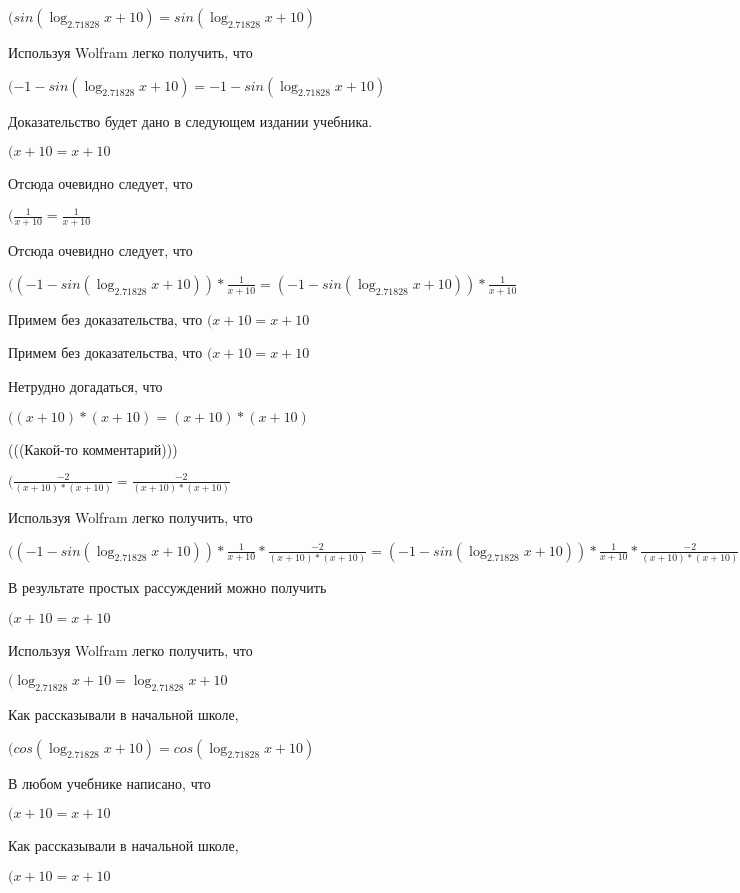 \documentclass[12pt,a4paper,fleqn]{article}
\theoremstyle{definition}
\begin{document}
$(sin(\log_{ 2.71828 }{ x  +  10 }) = sin(\log_{ 2.71828 }{ x  +  10 })$

Используя Wolfram легко получить, что

$( -1  - sin(\log_{ 2.71828 }{ x  +  10 }) =  -1  - sin(\log_{ 2.71828 }{ x  +  10 })$

Доказательство будет дано в следующем издании учебника.

$( x  +  10  =  x  +  10 $

Отсюда очевидно следует, что

$(\frac{ 1 }{ x  +  10 }
 = \frac{ 1 }{ x  +  10 }
$

Отсюда очевидно следует, что

$(( -1  - sin(\log_{ 2.71828 }{ x  +  10 })) * \frac{ 1 }{ x  +  10 }
 = ( -1  - sin(\log_{ 2.71828 }{ x  +  10 })) * \frac{ 1 }{ x  +  10 }
$

Примем без доказательства, что
$( x  +  10  =  x  +  10 $

Примем без доказательства, что
$( x  +  10  =  x  +  10 $

Нетрудно догадаться, что

$(( x  +  10 ) * ( x  +  10 ) = ( x  +  10 ) * ( x  +  10 )$

(((Какой-то комментарий)))

$(\frac{ -2 }{( x  +  10 ) * ( x  +  10 )}
 = \frac{ -2 }{( x  +  10 ) * ( x  +  10 )}
$

Используя Wolfram легко получить, что

$(( -1  - sin(\log_{ 2.71828 }{ x  +  10 })) * \frac{ 1 }{ x  +  10 }
 * \frac{ -2 }{( x  +  10 ) * ( x  +  10 )}
 = ( -1  - sin(\log_{ 2.71828 }{ x  +  10 })) * \frac{ 1 }{ x  +  10 }
 * \frac{ -2 }{( x  +  10 ) * ( x  +  10 )}
$

В результате простых рассуждений можно получить

$( x  +  10  =  x  +  10 $

Используя Wolfram легко получить, что

$(\log_{ 2.71828 }{ x  +  10 } = \log_{ 2.71828 }{ x  +  10 }$

Как рассказывали в начальной школе,

$(cos(\log_{ 2.71828 }{ x  +  10 }) = cos(\log_{ 2.71828 }{ x  +  10 })$

В любом учебнике написано, что

$( x  +  10  =  x  +  10 $

Как рассказывали в начальной школе,

$( x  +  10  =  x  +  10 $
\end{document}
